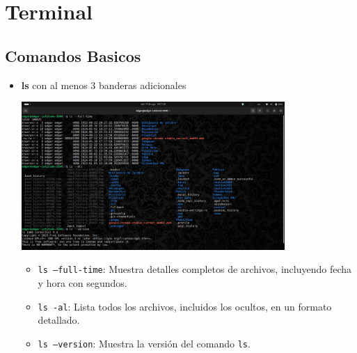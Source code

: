 \section*{Terminal}


\subsection*{Comandos Basicos}



\begin{itemize}
    \item \textbf{ls} con al menos 3 banderas adicionales
    \begin{center}
        \includegraphics[width=10cm]{IMAGE/ls.png}
    \end{center}
    \begin{itemize}
        \item \texttt{ls --full-time}: Muestra detalles completos de archivos, incluyendo fecha y hora con segundos.
        \item \texttt{ls -al}: Lista todos los archivos, incluidos los ocultos, en un formato detallado.
        \item \texttt{ls --version}: Muestra la versión del comando \texttt{ls}.
    \end{itemize}


\end{itemize}
